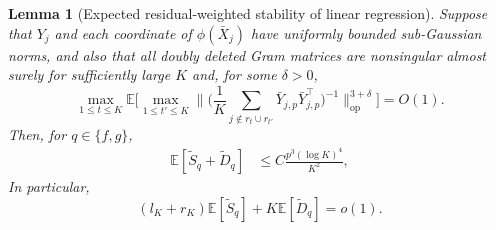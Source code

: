 \documentclass[12pt]{article}
\def\E{\mathbb{E}}
\newtheorem{lemma}[theorem]{Lemma}
\numberwithin{equation}{section}
\begin{document}
\begin{lemma}[Expected residual-weighted stability of linear regression]
\label{prop:linear-weighted-stability}
Suppose that $Y_j$ and each coordinate of $\phi(\bar X_j)$ have uniformly bounded sub-Gaussian norms,
and also that all doubly deleted Gram matrices are
nonsingular almost surely for sufficiently large $K$ and,
for some $\delta>0$,
\begin{equation}
\label{eq:linear-weighted-inverse}
\max_{1\leq t\leq K}\E\Big[
\max_{1\leq t'\leq K}
\Big\|
\big(
\frac1K
\sum_{j\notin r_t\cup r_{t'}}
\bar Y_{j,p}\bar Y_{j,p}^\top
\big)^{-1}
\Big\|_{\mathrm{op}}^{3+\delta}
\Big]
=O(1).
\end{equation}
Then, for $q\in\{f,g\}$,
\begin{align}
\E[\tilde S_q+\tilde D_q]
&\leq
C\frac{p^3(\log K)^4}{K^2},
\label{eq:linear-weighted-stability-rate}
\end{align}
In particular,
\[
(l_K+r_K)\E[\tilde S_q]+K\E[\tilde D_q]=o(1).
\]
\end{lemma}
\end{document}
